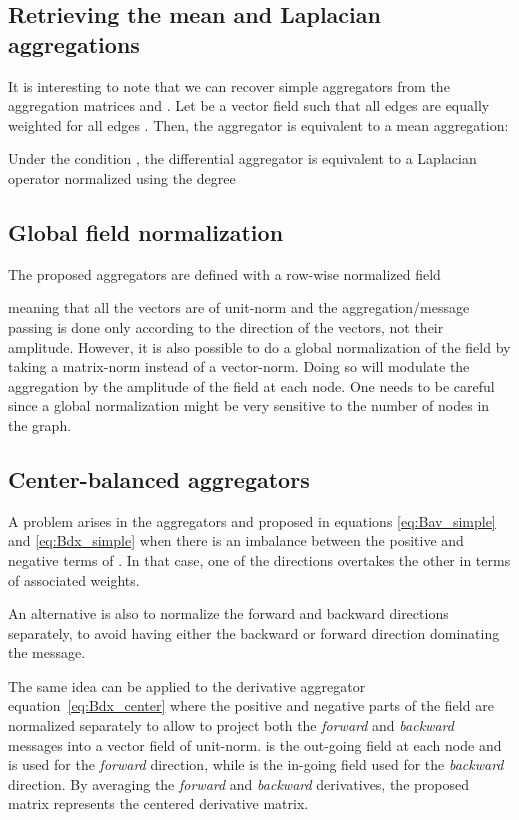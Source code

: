 \documentclass{article} \usepackage{arxiv,times}
\def\eqref#1{equation~\ref{#1}}
\begin{document}
\subsection{Retrieving the mean and Laplacian aggregations}
\label{app:simple_agg_examples}
It is interesting to note that we can recover simple aggregators from the aggregation matrices  and . Let  be a vector field such that all edges are equally weighted  for all edges . Then, the aggregator  is equivalent to a mean aggregation:

Under the condition , the differential aggregator is equivalent to a Laplacian operator  normalized using the degree 


\subsection{Global field normalization}

The proposed aggregators are defined with a row-wise normalized field 

meaning that all the vectors are of unit-norm and the aggregation/message passing is done only according to the direction of the vectors, not their amplitude. However, it is also possible to do a global normalization of the field  by taking a matrix-norm instead of a vector-norm. Doing so will modulate the aggregation by the amplitude of the field at each node. One needs to be careful since a global normalization might be very sensitive to the number of nodes in the graph.


\subsection{Center-balanced aggregators}

A problem arises in the aggregators  and  proposed in equations \ref{eq:Bav_simple} and \ref{eq:Bdx_simple} when there is an imbalance between the positive and negative terms of . In that case, one of the directions overtakes the other in terms of associated weights.

An alternative is also to normalize the forward and backward directions separately, to avoid having either the backward or forward direction dominating the message.



The same idea can be applied to the derivative aggregator \eqref{eq:Bdx_center} where the positive and negative parts of the field  are normalized separately to allow to project both the \textit{forward} and \textit{backward} messages into a vector field of unit-norm.  is the out-going field at each node and is used for the \textit{forward} direction, while  is the in-going field used for the \textit{backward} direction. By averaging the \textit{forward} and \textit{backward} derivatives, the proposed matrix  represents the centered derivative matrix.
\end{document}
